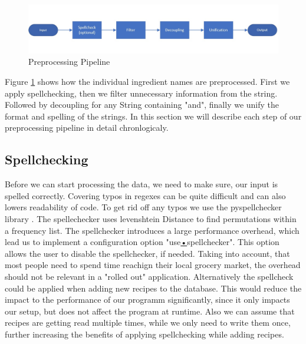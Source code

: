 \begin{figure}
	\centering
	\includegraphics[scale=0.45]{Figures/pipeline.jpg}
	\caption[Preprocessing Pipeline]{Preprocessing Pipeline}\label{fig:pipe}
\end{figure}

Figure \ref{fig:pipe} shows how the individual ingredient names are preprocessed.
First we apply spellchecking, then we filter unnecessary information from the string. Followed by  decoupling for any String containing "and", finally we unify the format and spelling of the strings. In this section we will describe each step of our preprocessing pipeline in detail chronlogicaly.

\subsection{Spellchecking}\label{sub:spellcheck}
Before we can start processing the data, we need to make sure, our input is spelled correctly. Covering typos in regexes can be quite difficult and can also lowers readability of code. To get rid off any typos we use the pyspellchecker library \cite{spellchecker}. The spellechecker uses levenshtein Distance to find permutations within a frequency list. The spellchecker introduces a large performance overhead, which lead us to implement a configuration option "use\underline{•}spellchecker". This option allows the user to disable the spellchecker, if needed. Taking into account, that most people need to spend time reachign their local grocery market, the overhead should not be relevant in a "rolled out" application. Alternatively the spellcheck could be applied when adding new recipes to the database. This would reduce the impact to the performance of our programm significantly, since it only impacts our setup, but does not affect the program at runtime. Also we can assume that recipes are getting read multiple times, while we only need to write them once, further increasing the benefits of applying spellchecking while adding recipes.
